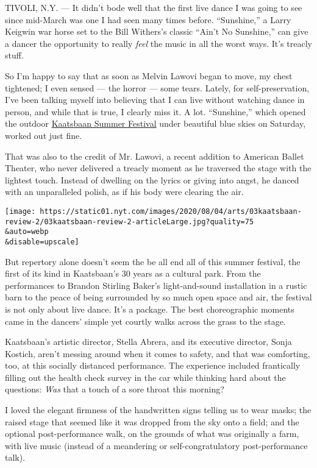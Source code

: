 TIVOLI, N.Y. --- It didn't bode well that the first live dance I was
going to see since mid-March was one I had seen many times before.
``Sunshine,'' a Larry Keigwin war horse set to the Bill Withers's
classic ``Ain't No Sunshine,'' can give a dancer the opportunity to
really \emph{feel} the music in all the worst ways. It's treacly stuff.

So I'm happy to say that as soon as Melvin Lawovi began to move, my
chest tightened; I even sensed --- the horror --- some tears. Lately,
for self-preservation, I've been talking myself into believing that I
can live without watching dance in person, and while that is true, I
clearly miss it. A lot. ``Sunshine,'' which opened the outdoor
\href{https://www.nytimes.com/2020/07/29/arts/dance/kaatsbaan-dance-festival-stella-abrera.html}{Kaatsbaan
Summer Festival} under beautiful blue skies on Saturday, worked out just
fine.

That was also to the credit of Mr. Lawovi, a recent addition to American
Ballet Theater, who never delivered a treacly moment as he traversed the
stage with the lightest touch. Instead of dwelling on the lyrics or
giving into angst, he danced with an unparalleled polish, as if his body
were clearing the air.

\texttt{[image: https://static01.nyt.com/images/2020/08/04/arts/03kaatsbaan-review-2/03kaatsbaan-review-2-articleLarge.jpg?quality=75\\\&auto=webp\\\&disable=upscale]}

But repertory alone doesn't seem the be all end all of this summer
festival, the first of its kind in Kaatsbaan's 30 years as a cultural
park. From the performances to Brandon Stirling Baker's light-and-sound
installation in a rustic barn to the peace of being surrounded by so
much open space and air, the festival is not only about live dance. It's
a package. The best choreographic moments came in the dancers' simple
yet courtly walks across the grass to the stage.

Kaatsbaan's artistic director, Stella Abrera, and its executive
director, Sonja Kostich, aren't messing around when it comes to safety,
and that was comforting, too, at this socially distanced performance.
The experience included frantically filling out the health check survey
in the car while thinking hard about the questions: \emph{Was} that a
touch of a sore throat this morning?

I loved the elegant firmness of the handwritten signs telling us to wear
masks; the raised stage that seemed like it was dropped from the sky
onto a field; and the optional post-performance walk, on the grounds of
what was originally a farm, with live music (instead of a meandering or
self-congratulatory post-performance talk).

